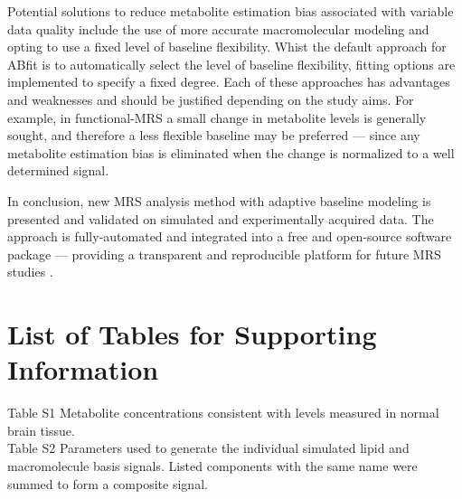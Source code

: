\documentclass[num-refs]{wiley-article}
\begin{document}
Potential solutions to reduce metabolite estimation bias associated with variable data quality include the use of more accurate macromolecular modeling \cite{Birch2017} and opting to use a fixed level of baseline flexibility. Whist the default approach for ABfit is to automatically select the level of baseline flexibility, fitting options are implemented to specify a fixed degree. Each of these approaches has advantages and weaknesses and should be justified depending on the study aims. For example, in functional-MRS a small change in metabolite levels is generally sought, and therefore a less flexible baseline may be preferred --- since any metabolite estimation bias is eliminated when the change is normalized to a well determined signal.

In conclusion, new MRS analysis method with adaptive baseline modeling is presented and validated on simulated and experimentally acquired data. The approach is fully-automated and integrated into a free and open-source software package --- providing a transparent and reproducible platform for future MRS studies \cite{Stikov2019}.




\clearpage
\listoffigures

\section*{List of Tables for Supporting Information}
Table S1 Metabolite concentrations consistent with levels measured in normal brain tissue. \\
Table S2 Parameters used to generate the individual simulated lipid and macromolecule basis signals. Listed components with the same name were summed to form a composite signal. \\
\end{document}
